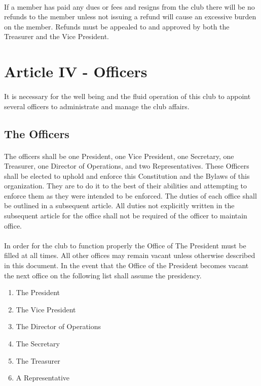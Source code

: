 \documentclass[12pt]{article}
\newcommand{\article}[1]{
\setcounter{section}{0}
\setcounter{subsection}{0}

	\section*{#1}
	\addcontentsline{toc}{section}{#1}
	
}
\begin{document}
\paragraph{}
If a member has paid any dues or fees and resigns from the club there will be no refunds to the member unless not issuing a refund will cause an excessive burden on the member. Refunds must be appealed to and approved by both the Treasurer and the Vice President.


\article{Article IV - Officers}
\paragraph{}
It is necessary for the well being and the fluid operation of this club to appoint several officers to administrate and manage the club affairs.

\subsection{The Officers}
\paragraph{}
The officers shall be one President, one Vice President, one Secretary, one Treasurer, one Director of Operations, and two Representatives. These Officers shall be elected to uphold and enforce this Constitution and the Bylaws of this organization. They are to do it to the best of their abilities and attempting to enforce them as they were intended to be enforced. The duties of each office shall be outlined in a subsequent article. All duties not explicitly written in the subsequent article for the office shall not be required of the officer to maintain office.

\paragraph{}
In order for the club to function properly the Office of The President must be filled at all times.
All other offices may remain vacant unless otherwise described in this document. 
In the event that the Office of the President becomes vacant
the next office on the following list shall assume the presidency. 

\begin{enumerate}
\item The President
\item The Vice President
\item The Director of Operations
\item The Secretary
\item The Treasurer
\item A Representative
\end{enumerate}
\end{document}

